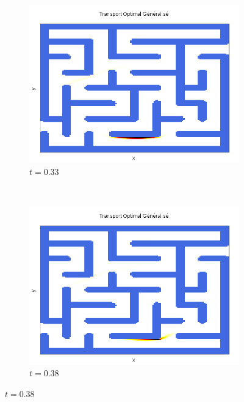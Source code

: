 \documentclass[a4paper,12pt]{article}
\begin{document}
\begin{figure}[!h]
\begin{subfigure}[b]{0.23\linewidth}
\includegraphics[width=\linewidth]{img/2DLabyrinthe/T_00034.png}
\caption*{$t=0.33$}
\end{subfigure}
~
\begin{subfigure}[b]{0.23\linewidth}
\includegraphics[width=\linewidth]{img/2DLabyrinthe/T_00039.png}
\caption*{$t=0.38$}
\end{subfigure}


\end{figure}
\end{document}
